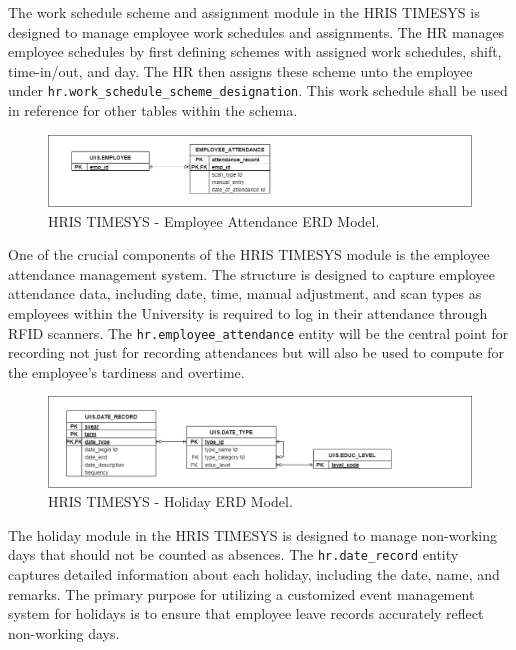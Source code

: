     The work schedule scheme and assignment module in the HRIS TIMESYS is designed to manage employee work schedules and assignments. The HR manages employee schedules by first defining schemes with assigned work schedules, shift, time-in/out, and day. The HR then assigns these scheme unto the employee under \texttt{hr.work\_schedule\_scheme\_designation}. This work schedule shall be used in reference for other tables within the schema.

    \begin{figure}[H]
        \centering
        \includegraphics[width=1\linewidth]{figures/images/diagrams/erd/erd-timesys-employee-attendance.png}
        \caption{HRIS TIMESYS - Employee Attendance ERD Model.}
        \label{fig:erd-timesys-employee-attendance}
    \end{figure}

    One of the crucial components of the HRIS TIMESYS module is the employee attendance management system. The structure is designed to capture employee attendance data, including date, time, manual adjustment, and scan types as employees within the University is required to log in their attendance through RFID scanners. The \texttt{hr.employee\_attendance} entity will be the central point for recording not just for recording attendances but will also be used to compute for the employee's tardiness and overtime.

    \begin{figure}[H]
        \centering
        \includegraphics[width=1\linewidth]{figures/images/diagrams/erd/erd-timesys-holiday.png}
        \caption{HRIS TIMESYS - Holiday ERD Model.}
        \label{fig:erd-timesys-holiday}
    \end{figure}

    The holiday module in the HRIS TIMESYS is designed to manage non-working days that should not be counted as absences. The \texttt{hr.date\_record} entity captures detailed information about each holiday, including the date, name, and remarks. The primary purpose for utilizing a customized event management system for holidays is to ensure that employee leave records accurately reflect non-working days. 

